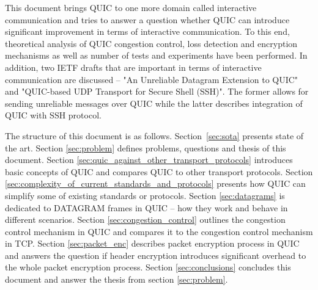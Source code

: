 This document brings QUIC to one more domain called interactive communication and tries to answer a question whether QUIC can introduce significant improvement in terms of interactive communication.
To this end, theoretical analysis of QUIC congestion control, loss detection and encryption mechanisms as well as  number of tests and experiments have been performed.
In addition, two IETF drafts that are important in terms of interactive communication are discussed -- "An Unreliable Datagram Extension to QUIC" and "QUIC-based UDP Transport for Secure Shell (SSH)".
The former allows for sending unreliable messages over QUIC while the latter describes integration of QUIC with SSH protocol.



The structure of this document is as follows.
Section~\ref{sec:sota} presents state of the art.
Section \ref{sec:problem} defines problems, questions and thesis of this document.
Section \ref{sec:quic_against_other_transport_protocols} introduces basic concepts of QUIC and compares QUIC to other transport protocols.
Section \ref{sec:complexity_of_current_standards_and_protocols} presents how QUIC can simplify some of existing standards or protocols.
Section \ref{sec:datagrams} is dedicated to DATAGRAM frames in QUIC -- how they work and behave in different scenarios.
Section \ref{sec:congestion_control} outlines the congestion control mechanism in QUIC and compares it to the congestion control mechanism in TCP.
Section \ref{sec:packet_enc} describes packet encryption process in QUIC and answers the question if header encryption introduces significant overhead to the whole packet encryption process.
Section \ref{sec:conclusions} concludes this document and answer the thesis from section \ref{sec:problem}.
